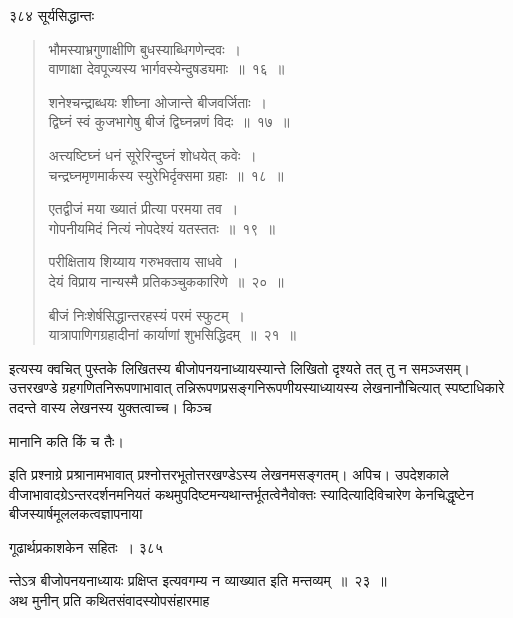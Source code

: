 \documentclass[11pt, openany]{book}
\begin{document}
\newpage



\noindent ३८४ \hspace{4cm} सूर्यसिद्धान्तः
\vspace{1cm}




\begin{quote}
 {\qt भौमस्याभ्रगुणाक्षीणि बुधस्याब्धिगणेन्दवः~।\\
 वाणाक्षा देवपूज्यस्य भार्गवस्येन्दुषड्यमाः~॥~१६~॥
 
शनेश्चन्द्राब्धयः शीघ्ना ओजान्ते बीजवर्जिताः~।\\
द्विघ्नं स्वं कुजभागेषु बीजं द्विघ्नन्नणं विदः~॥~१७~॥

अत्त्यष्टिघ्नं धनं सूरेरिन्दुघ्नं शोधयेत् कवेः~।\\
चन्द्रघ्नमृणमार्कस्य स्युरेभिर्दृक्समा ग्रहाः~॥~१८~॥

एतद्वीजं मया ख्यातं प्रीत्या परमया तव~।\\
गोपनीयमिदं नित्यं नोपदेश्यं यतस्ततः~॥~१९~॥

परीक्षिताय शिय्याय गरुभक्ताय साधवे~।\\
देयं विप्राय नान्यस्मै प्रतिकञ्चुककारिणे~॥~२०~॥

बीजं निःशेर्षसिद्धान्तरहस्यं परमं स्फुटम्~।\\
यात्रापाणिगग्रहादीनां कार्याणां शुभसिद्धिदम्~॥~२१~॥ }
\end{quote}

इत्यस्य क्वचित् पुस्तके लिखितस्य बीजोपनयनाध्यायस्यान्ते लिखितो दृश्यते तत् तु न समञ्जसम्। उत्तरखण्डे ग्रहगणितनिरूपणाभावात् तन्निरूपणप्रसङ्गनिरूपणीयस्याध्यायस्य लेखनानौचित्यात् स्पष्टाधिकारे तदन्ते वास्य लेखनस्य युक्तत्वाच्च। किञ्च 

\begin{center}
  मानानि कति किं च तैः। 
\end{center}

इति प्रश्नाग्रे प्रश्रानामभावात् प्रश्नोत्तरभूतोत्तरखण्डेऽस्य लेखनमसङ्गतम्। अपिच। उपदेशकाले वीजाभावादग्रेऽन्तरदर्शनमनियतं कथमुपदिष्टमन्यथान्तर्भूतत्वेनैवोक्तः स्यादित्यादिविचारेण केनचिद्धृष्टेन बीजस्यार्षमूललकत्वज्ञापनाया\textendash



\newpage


\hspace{3cm} गूढार्थप्रकाशकेन सहितः~। \hfill ३८५
\vspace{1cm}


\noindent न्तेऽत्र बीजोपनयनाध्यायः प्रक्षिप्त इत्यवगम्य न व्याख्यात इति मन्तव्यम्~॥~२३~॥\\
\noindent अथ मुनीन् प्रति कथितसंवादस्योपसंहारमाह\textendash 
\end{document}
